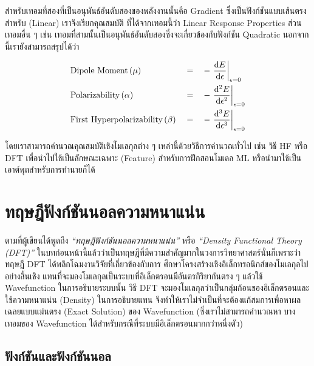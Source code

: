 \noindent สำหรับเทอมที่สองที่เป็นอนุพันธ์อันดับสองของพลังงานนั้นคือ Gradient ซึ่งเป็นฟังก์ชันแบบเส้นตรงสำหรับ (Linear) เราจึงเรียกคุณสมบัติ%
ที่ได้จากเทอมนี้ว่า Linear Response Properties ส่วนเทอมอื่น ๆ เช่น เทอมที่สามนั้นเป็นอนุพันธ์อันดับสองซึ่งจะเกี่ยวข้องกับฟังก์ชัน Quadratic
นอกจากนี้เรายังสามารถสรุปได้ว่า

\begin{framed}
    \begin{align*}
         & \text{Dipole Moment}\,(\mu)               &  & = &  & -\evaluated{\dv{E}{\epsilon}}_{\epsilon = 0}    \\
         & \text{Polarizability}\,(\alpha)           &  & = &  & -\evaluated{\dv[2]{E}{\epsilon}}_{\epsilon = 0} \\
         & \text{First Hyperpolarizability}\,(\beta) &  & = &  & -\evaluated{\dv[3]{E}{\epsilon}}_{\epsilon = 0}
    \end{align*}
\end{framed}

โดยเราสามารถคำนวณคุณสมบัติเชิงโมเลกุลต่าง ๆ เหล่านี้ด้วยวิธีการคำนวณทั่วไป เช่น วิธี HF หรือ DFT เพื่อนำไปใช้เป็นลักษณะเฉพาะ (Feature)
สำหรับการฝึกสอนโมเดล ML หรือนำมาใช้เป็นเอาต์พุตสำหรับการทำนายก็ได้

\section{ทฤษฎีฟังก์ชันนอลความหนาแน่น}
\label{sec:dft}

ตามที่ผู้เขียนได้พูดถึง \textit{\enquote{ทฤษฎีฟังก์ชันนอลความหนาแน่น}} หรือ \textit{\enquote{Density Functional Theory
        (DFT)}} ในบทก่อนหน้านี้แล้วว่าเป็นทฤษฎีที่มีความสำคัญมากในวงการวิทยาศาสตร์นั่นก็เพราะว่าทฤษฎี DFT ได้พลิกโฉมงานวิจัยที่เกี่ยวข้องกับการ%
ศึกษาโครงสร้างเชิงอิเล็กทรอนิกส์ของโมเลกุลไปอย่างสิ้นเชิง แทนที่จะมองโมเลกุลเป็นระบบที่อิเล็กตรอนมีอันตรกิริยากันตรง ๆ แล้วใช้
Wavefunction ในการอธิบายระบบนั้น วิธี DFT จะมองโมเลกุลว่าเป็นกลุ่มก้อนของอิเล็กตรอนและใช้ความหนาแน่น (Density) ในการอธิบายแทน
จึงทำให้เราไม่จำเป็นที่จะต้องแก้สมการเพื่อหาผลเฉลยแบบแม่นตรง (Exact Solution) ของ Wavefunction (ซึ่งเราไม่สามารถคำนวณหา%
บางเทอมของ Wavefunction ได้สำหรับกรณีที่ระบบมีอิเล็กตรอนมากกว่าหนึ่งตัว)

\subsection{ฟังก์ชันและฟังก์ชันนอล}
\label{ssec:function_functional}

